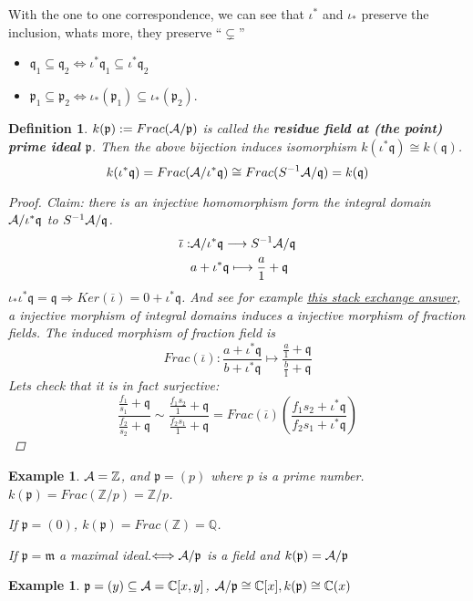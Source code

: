 \documentclass[11pt]{article}
\newtheorem{dfn}[thm]{Definition}
\newtheorem{ex}[thm]{Example}
\newcommand{\cplx}{\mathbb C}
\newcommand{\intg}{\mathbb Z}
\newcommand{\ratl}{\mathbb Q}
\newcommand{\scm}{{\mathfrak m}}
\newcommand{\scp}{{\mathfrak p}}
\newcommand{\scq}{\mathfrak q}
\newcommand{\cala}{{\cal A}}
\newcommand{\Lrta}{\Longrightarrow}
\newcommand{\lrta}{\longrightarrow}
\newcommand{\Llrta}{\Longleftrightarrow}
\begin{document}
With the one to one correspondence, we can see that $\iota^*$ and $\iota_*$ preserve the inclusion, whats more, they preserve ``$\subsetneq$''
\begin{itemize}
\item $\scq_1\subseteq \scq_2\Llrta \iota^*\scq_1\subseteq \iota^*\scq_2$
\item $\scp_1\subseteq \scp_2\Llrta\iota_*(\scp_1)\subseteq\iota_*(\scp_2)$.
\end{itemize}
\begin{dfn}
$k(\scp):=Frac(\cala/\scp)$ is called the \textbf{residue field at (the point) prime ideal $\scp$}.
Then the above bijection induces isomorphism $k(\iota^*\scq)\cong k(\scq)$.
$$
k(\iota^*\scq)=Frac(\cala/\iota^*\scq)\cong Frac(S^{-1}\cala/\scq)=k(\scq)
$$
{\color{red}
\begin{proof}
Claim: there is an injective homomorphism form the integral domain $\cala/\iota^*\scq$ to $S^{-1}\cala/\scq$.
$$
\begin{aligned}
\overline{\iota}:&\cala/\iota^* \scq\lrta S^{-1}\cala/\scq\\
& a+\iota^*\scq\longmapsto \frac{a}{1}+\scq
\end{aligned}
$$
$\iota_*\iota^*\scq=\scq\Lrta Ker(\overline{\iota})=0+\iota^*\scq$. And see for example  
 \href{https://math.stackexchange.com/questions/2123201/relation-between-integral-domains-with-isomorphic-fraction-fields}{this stack exchange answer}, a injective morphism of integral domains induces a injective morphism of fraction fields. The induced morphism of fraction field is 
 $$
 Frac(\overline{\iota}):\frac{a+\iota^*\scq}{b+\iota^*\scq}\longmapsto \frac{\frac{a}{1}+\scq}{\frac{b}{1}+\scq}
 $$
 Lets check that it is in fact surjective: 
 $$
 \frac{\frac{f_1}{s_1}+\scq}{\frac{f_2}{s_2}+\scq}\sim \frac{\frac{f_1 s_2}{1}+\scq}{\frac{f_2 s_1}{1}+\scq}=Frac(\overline{\iota})\left(\frac{f_1 s_2+\iota^*\scq}{f_2 s_1+\iota^*\scq}\right)
 $$
\end{proof}}
\end{dfn}
\begin{ex}
$\cala=\intg$, and $\scp=(p)$ where $p$ is a prime number. $k(\scp)=Frac(\intg/p)=\intg/p$.

If $\scp=(0)$, $k(\scp)=Frac(\intg)=\ratl$.

If $\scp=\scm$ a  maximal ideal.$\Llrta\cala/\scp$ is a field and $k(\scp)=\cala/\scp$ 
\end{ex}

\begin{ex}
$\scp=(y)\subseteq\cala=\cplx[x,y]$, $\cala/\scp\cong \cplx[x], k(\scp)\cong \cplx(x)$
\end{ex}
\end{document}
